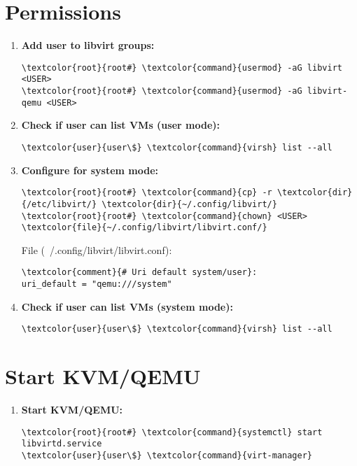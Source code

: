 \documentclass[10pt, a4paper, onecolumn, openany]{book} %
\begin{document}
\section{Permissions}
\begin{enumerate}
    \item \textbf{Add user to libvirt groups:}
\begin{Verbatim}[commandchars=\\\{\}]
\textcolor{root}{root#} \textcolor{command}{usermod} -aG libvirt <USER>
\textcolor{root}{root#} \textcolor{command}{usermod} -aG libvirt-qemu <USER>
\end{Verbatim}
    \item \textbf{Check if user can list VMs (user mode):}
\begin{Verbatim}[commandchars=\\\{\}]
\textcolor{user}{user\$} \textcolor{command}{virsh} list --all
\end{Verbatim}
    \item \textbf{Configure for system mode:}
\begin{Verbatim}[commandchars=\\\{\}]
\textcolor{root}{root#} \textcolor{command}{cp} -r \textcolor{dir}{/etc/libvirt/} \textcolor{dir}{~/.config/libvirt/}
\textcolor{root}{root#} \textcolor{command}{chown} <USER> \textcolor{file}{~/.config/libvirt/libvirt.conf/}
\end{Verbatim}
File (\textcolor{file}{~/.config/libvirt/libvirt.conf}):
\begin{Verbatim}[commandchars=\\\{\}]
\textcolor{comment}{# Uri default system/user}:
uri_default = "qemu:///system"
\end{Verbatim}
    \item \textbf{Check if user can list VMs (system mode):}
\begin{Verbatim}[commandchars=\\\{\}]
\textcolor{user}{user\$} \textcolor{command}{virsh} list --all
\end{Verbatim}
\end{enumerate}
\section{Start KVM/QEMU}
\begin{enumerate}
    \item \textbf{Start KVM/QEMU:}
\begin{Verbatim}[commandchars=\\\{\}]
\textcolor{root}{root#} \textcolor{command}{systemctl} start libvirtd.service
\textcolor{user}{user\$} \textcolor{command}{virt-manager}
\end{Verbatim}
\end{enumerate}
\end{document}
